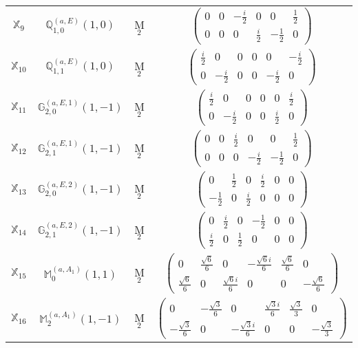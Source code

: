 \documentclass[fleqn,10pt,landscape]{article}
\begin{document}
\begin{itemize}
\begin{center}
\begin{longtable}{c|c|c|c}
$ \mathbb{X}_{9} $ & $\mathbb{Q}_{1,0}^{(a,E)}(1,0)$ & M$_{2}$ & $\begin{pmatrix} 0 & 0 & - \frac{i}{2} & 0 & 0 & \frac{1}{2} \\ 0 & 0 & 0 & \frac{i}{2} & - \frac{1}{2} & 0 \end{pmatrix}$ \\
$ \mathbb{X}_{10} $ & $\mathbb{Q}_{1,1}^{(a,E)}(1,0)$ & M$_{2}$ & $\begin{pmatrix} \frac{i}{2} & 0 & 0 & 0 & 0 & - \frac{i}{2} \\ 0 & - \frac{i}{2} & 0 & 0 & - \frac{i}{2} & 0 \end{pmatrix}$ \\
$ \mathbb{X}_{11} $ & $\mathbb{G}_{2,0}^{(a,E,1)}(1,-1)$ & M$_{2}$ & $\begin{pmatrix} \frac{i}{2} & 0 & 0 & 0 & 0 & \frac{i}{2} \\ 0 & - \frac{i}{2} & 0 & 0 & \frac{i}{2} & 0 \end{pmatrix}$ \\
$ \mathbb{X}_{12} $ & $\mathbb{G}_{2,1}^{(a,E,1)}(1,-1)$ & M$_{2}$ & $\begin{pmatrix} 0 & 0 & \frac{i}{2} & 0 & 0 & \frac{1}{2} \\ 0 & 0 & 0 & - \frac{i}{2} & - \frac{1}{2} & 0 \end{pmatrix}$ \\
$ \mathbb{X}_{13} $ & $\mathbb{G}_{2,0}^{(a,E,2)}(1,-1)$ & M$_{2}$ & $\begin{pmatrix} 0 & \frac{1}{2} & 0 & \frac{i}{2} & 0 & 0 \\ - \frac{1}{2} & 0 & \frac{i}{2} & 0 & 0 & 0 \end{pmatrix}$ \\
$ \mathbb{X}_{14} $ & $\mathbb{G}_{2,1}^{(a,E,2)}(1,-1)$ & M$_{2}$ & $\begin{pmatrix} 0 & \frac{i}{2} & 0 & - \frac{1}{2} & 0 & 0 \\ \frac{i}{2} & 0 & \frac{1}{2} & 0 & 0 & 0 \end{pmatrix}$ \\
$ \mathbb{X}_{15} $ & $\mathbb{M}_{0}^{(a,A_{1})}(1,1)$ & M$_{2}$ & $\begin{pmatrix} 0 & \frac{\sqrt{6}}{6} & 0 & - \frac{\sqrt{6} i}{6} & \frac{\sqrt{6}}{6} & 0 \\ \frac{\sqrt{6}}{6} & 0 & \frac{\sqrt{6} i}{6} & 0 & 0 & - \frac{\sqrt{6}}{6} \end{pmatrix}$ \\
$ \mathbb{X}_{16} $ & $\mathbb{M}_{2}^{(a,A_{1})}(1,-1)$ & M$_{2}$ & $\begin{pmatrix} 0 & - \frac{\sqrt{3}}{6} & 0 & \frac{\sqrt{3} i}{6} & \frac{\sqrt{3}}{3} & 0 \\ - \frac{\sqrt{3}}{6} & 0 & - \frac{\sqrt{3} i}{6} & 0 & 0 & - \frac{\sqrt{3}}{3} \end{pmatrix}$ \\

\end{longtable}
\end{center}
\end{itemize}
\end{document}
